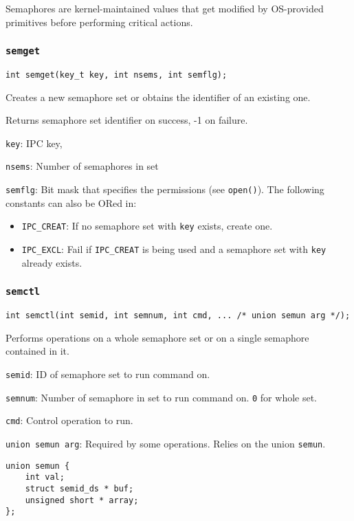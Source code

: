 \documentclass{article}
\begin{document}
Semaphores are kernel-maintained values that get modified by OS-provided primitives before performing critical actions.

\subsubsection{\texttt{semget}}

\begin{verbatim}
int semget(key_t key, int nsems, int semflg);
\end{verbatim}

Creates a new semaphore set or obtains the identifier of an existing one.

Returns semaphore set identifier on success, -1 on failure.

\texttt{key}: IPC key,

\texttt{nsems}: Number of semaphores in set

\texttt{semflg}: Bit mask that specifies the permissions (see \texttt{open()}). The following constants can also be ORed in:

\begin{itemize}
    \item \texttt{IPC\_CREAT}: If no semaphore set with \texttt{key} exists, create one.
    \item \texttt{IPC\_EXCL}: Fail if \texttt{IPC\_CREAT} is being used and a semaphore set with \texttt{key} already exists.
\end{itemize}


\subsubsection{\texttt{semctl}}

\begin{verbatim}
int semctl(int semid, int semnum, int cmd, ... /* union semun arg */);
\end{verbatim}

Performs operations on a whole semaphore set or on a single semaphore contained in it.

\texttt{semid}: ID of semaphore set to run command on.

\texttt{semnum}: Number of semaphore in set to run command on. \texttt{0} for whole set.

\texttt{cmd}: Control operation to run.

\texttt{union semun arg}: Required by some operations. Relies on the union \texttt{semun}.

\begin{verbatim}
union semun {
    int val;
    struct semid_ds * buf;
    unsigned short * array;
};
\end{verbatim}
\end{document}
